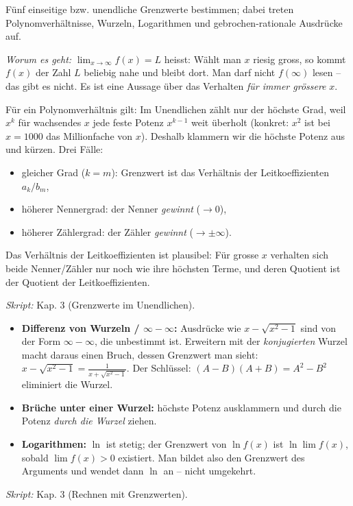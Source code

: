 

Fünf einseitige bzw. unendliche Grenzwerte bestimmen; dabei treten
Polynomverhältnisse, Wurzeln, Logarithmen und gebrochen-rationale Ausdrücke
auf.

\begin{werkzeugkasten}
\emph{Worum es geht:} \emph{$\lim_{x\to\infty} f(x)=L$} heisst: Wählt man $x$
riesig gross, so kommt $f(x)$ der Zahl $L$ beliebig nahe und bleibt dort.
Man darf nicht \emph{$f(\infty)$} lesen -- das gibt es nicht. Es ist eine
Aussage über das Verhalten \emph{für immer grössere} $x$.

Für ein Polynomverhältnis gilt: Im Unendlichen zählt nur der höchste Grad,
weil $x^k$ für wachsendes $x$ jede feste Potenz $x^{k-1}$ weit überholt
(konkret: $x^2$ ist bei $x=1000$ das Millionfache von $x$). Deshalb klammern
wir die höchste Potenz aus und kürzen. Drei Fälle:
\begin{itemize}
  \item gleicher Grad ($k=m$): Grenzwert ist das Verhältnis der
        Leitkoeffizienten $a_k/b_m$,
  \item höherer Nennergrad: der Nenner \emph{gewinnt} ($\to 0$),
  \item höherer Zählergrad: der Zähler \emph{gewinnt} ($\to \pm\infty$).
\end{itemize}
Das Verhältnis der Leitkoeffizienten ist plausibel: Für grosse $x$ verhalten
sich beide Nenner/Zähler nur noch wie ihre höchsten Terme, und deren
Quotient ist der Quotient der Leitkoeffizienten.

\textit{Skript:} Kap. 3 (Grenzwerte im Unendlichen).
\end{werkzeugkasten}

\begin{werkzeugkasten}
\begin{itemize}
  \item \textbf{Differenz von Wurzeln / $\infty-\infty$:} Ausdrücke wie
        $x-\sqrt{x^2-1}$ sind von der Form $\infty-\infty$, die
        unbestimmt ist. Erweitern mit der \emph{konjugierten} Wurzel macht
        daraus einen Bruch, dessen Grenzwert man sieht:
        $x-\sqrt{x^2-1}=\frac{1}{x+\sqrt{x^2-1}}$.
        Der Schlüssel: $(A-B)(A+B)=A^2-B^2$ eliminiert die Wurzel.
  \item \textbf{Brüche unter einer Wurzel:} höchste Potenz ausklammern und
        durch die Potenz \emph{durch die Wurzel} ziehen.
  \item \textbf{Logarithmen:} $\ln$ ist stetig; der Grenzwert von
        $\ln f(x)$ ist $\ln\lim f(x)$, sobald $\lim f(x)>0$ existiert. Man
        bildet also den Grenzwert des Arguments und wendet dann $\ln$ an --
        nicht umgekehrt.
\end{itemize}

\textit{Skript:} Kap. 3 (Rechnen mit Grenzwerten).
\end{werkzeugkasten}

